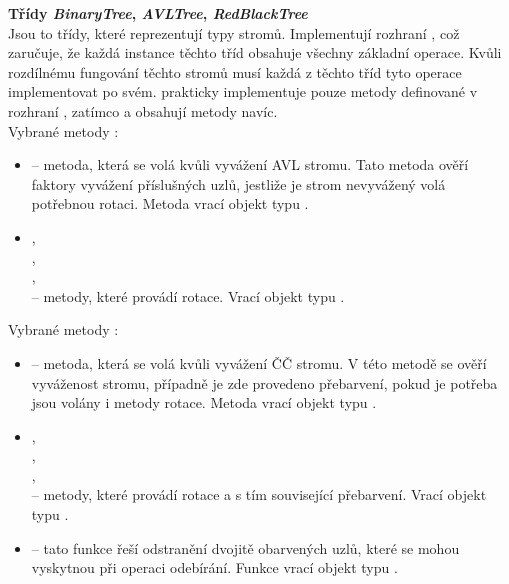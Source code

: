 \documentclass[
  biblatex=false,
  font=serif,
  glossaries=false,
  tables=false,
  theorems=false,
  index
]{kidiplom}
\begin{document}
\noindent \textbf{Třídy \textit{BinaryTree}, \textit{AVLTree}, \textit{RedBlackTree}}\\
\indent Jsou to třídy, které reprezentují typy stromů. Implementují rozhraní , což zaručuje, že každá instance těchto tříd obsahuje všechny základní operace. Kvůli rozdílnému fungování těchto stromů musí každá z těchto tříd tyto operace implementovat po svém.  prakticky implementuje pouze metody definované v rozhraní , zatímco  a  obsahují metody navíc.\\
\newpage
\noindent Vybrané metody :
\begin{itemize}
\item {} -- metoda, která se volá kvůli vyvážení AVL stromu. Tato metoda ověří faktory vyvážení příslušných uzlů, jestliže je strom nevyvážený volá potřebnou rotaci. Metoda vrací objekt typu .
\item {},\\
,\\
,\\
 -- metody, které provádí rotace. Vrací objekt typu .
\end{itemize}

\noindent Vybrané metody :
\begin{itemize}
\item {} -- metoda, která se volá kvůli vyvážení ČČ stromu. V této metodě se ověří vyváženost stromu, případně je zde provedeno přebarvení, pokud je potřeba jsou volány i metody rotace. Metoda vrací objekt typu .
\item {},\\
,\\
,\\
 -- metody, které provádí rotace  a s tím související přebarvení. Vrací objekt typu . 
\item {} -- tato funkce řeší odstranění dvojitě obarvených uzlů, které se mohou vyskytnou při operaci odebírání. Funkce vrací objekt typu .
\end{itemize}
\end{document}
